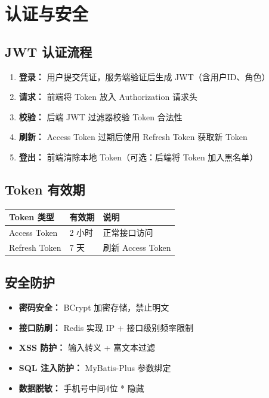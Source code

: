 \documentclass[12pt,a4paper,UTF8]{ctexart}
\begin{document}
\section{认证与安全}

\subsection{JWT 认证流程}

\begin{enumerate}[itemsep=5pt]
    \item \textbf{登录：} 用户提交凭证，服务端验证后生成 JWT（含用户ID、角色）
    \item \textbf{请求：} 前端将 Token 放入 Authorization 请求头
    \item \textbf{校验：} 后端 JWT 过滤器校验 Token 合法性
    \item \textbf{刷新：} Access Token 过期后使用 Refresh Token 获取新 Token
    \item \textbf{登出：} 前端清除本地 Token（可选：后端将 Token 加入黑名单）
\end{enumerate}

\subsection{Token 有效期}

\begin{longtable}{p{}|p{}|p{}}
    \toprule
    \textbf{Token 类型} & \textbf{有效期} & \textbf{说明} \\
    \midrule
    \endhead
    \bottomrule
    \endfoot

    Access Token & 2 小时 & 正常接口访问 \\
    Refresh Token & 7 天 & 刷新 Access Token \\
\end{longtable}

\subsection{安全防护}

\begin{itemize}[itemsep=3pt]
    \item \textbf{密码安全：} BCrypt 加密存储，禁止明文
    \item \textbf{接口防刷：} Redis 实现 IP + 接口级别频率限制
    \item \textbf{XSS 防护：} 输入转义 + 富文本过滤
    \item \textbf{SQL 注入防护：} MyBatis-Plus 参数绑定
    \item \textbf{数据脱敏：} 手机号中间4位 * 隐藏
\end{itemize}
\end{document}
